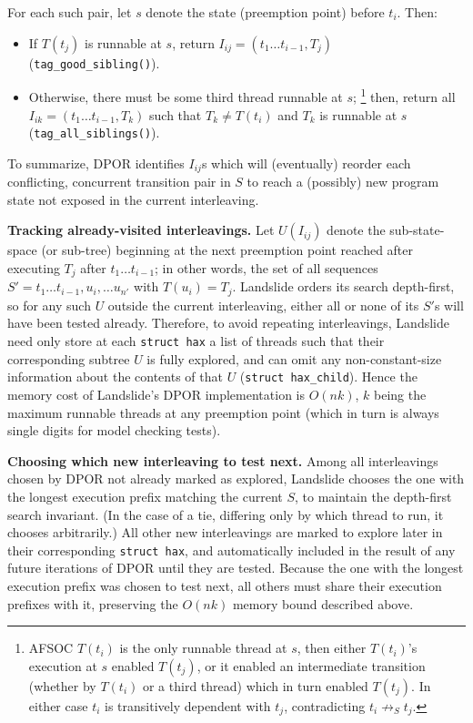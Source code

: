 For each such pair, let $s$ denote the state (preemption point) before $t_i$.
Then:
\begin{itemize}
	\item If $T(t_j)$ is runnable at $s$, return $I_{ij} = (t_1 \dots t_{i-1}, T_j)$ ({\tt tag\_good\_sibling()}).
	\item Otherwise, there must be some third thread runnable at $s$;
		\footnote{AFSOC $T(t_i)$ is the only runnable thread at $s$,
		then either $T(t_i)$'s execution at $s$ enabled $T(t_j)$,
		or it enabled an intermediate transition
		(whether by $T(t_i)$ or a third thread)
		which in turn enabled $T(t_j)$.
		In either case $t_i$ is transitively dependent with $t_j$, contradicting $t_i \not\rightarrow_S t_j$.}
		then, return all $I_{ik} = (t_1 \dots t_{i-1}, T_k)$ such that
		$T_k \ne T(t_i)$ and $T_k$ is runnable at $s$
		({\tt tag\_all\_siblings()}).
\end{itemize}

To summarize, %
DPOR identifies $I_{ij}$s which will (eventually) reorder each conflicting, concurrent transition pair in $S$
to reach a (possibly) new program state not exposed in the current interleaving.

{\bf Tracking already-visited interleavings.}
Let $U(I_{ij})$ denote the sub-state-space (or sub-tree) beginning at the next preemption point reached
after executing $T_j$ after $t_1 \dots t_{i-1}$;
in other words, the set of all sequences $S' = t_1 \dots t_{i-1}, u_i, \dots u_{n'}$ with $T(u_i) = T_j$.
Landslide orders its search depth-first,
so for any such $U$ outside the current interleaving,
either all or none of its $S'$s will have been tested already.
Therefore, to avoid repeating interleavings,
Landslide need only store at each {\tt struct hax} a list of threads
such that their corresponding subtree $U$ is fully explored,
and can omit any non-constant-size information about the contents of that $U$
({\tt struct hax\_child}).
Hence the memory cost of Landslide's DPOR implementation is $O(nk)$,
$k$ being the maximum runnable threads at any preemption point
(which in turn is always single digits for model checking tests).

{\bf Choosing which new interleaving to test next.}
Among all interleavings chosen by DPOR not already marked as explored,
Landslide chooses the one with the longest execution prefix matching the current $S$,
to maintain the depth-first search invariant.
(In the case of a tie, differing only by which thread to run, it chooses arbitrarily.)
All other new interleavings are marked to explore later in their corresponding {\tt struct hax},
and automatically included in the result of any future iterations of DPOR until they are tested.
Because the one with the longest execution prefix was chosen to test next,
all others must share their execution prefixes with it,
preserving the $O(nk)$ memory bound described above.

